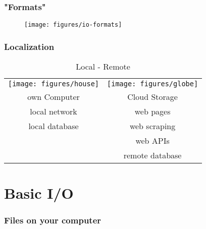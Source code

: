 \documentclass{beamer}
\begin{document}
\begin{frame}
	\frametitle{"Formats"}
	\begin{center}
		\begin{figure}
			\texttt{[image: figures/io-formats]}
			\label{fig:io}
		\end{figure}
	\end{center}
\end{frame}

\begin{frame}
	\frametitle{Localization}
	\begin{table}[t]
		\begin{center}
			\begin{tabular}{ c c }
				\texttt{[image: figures/house]} & 
				\texttt{[image: figures/globe]} \\
				own Computer & Cloud Storage \\
				local network & web pages \\
				local database & web scraping \\
				& web APIs \\
				& remote database \\
			\end{tabular}
		\end{center}
		\caption{Local - Remote}
	\end{table}
\end{frame}


\section{Basic I/O}


\begin{frame}
	\frametitle{Files on your computer}
	\lstBasicIOI
\end{frame}
\end{document}
